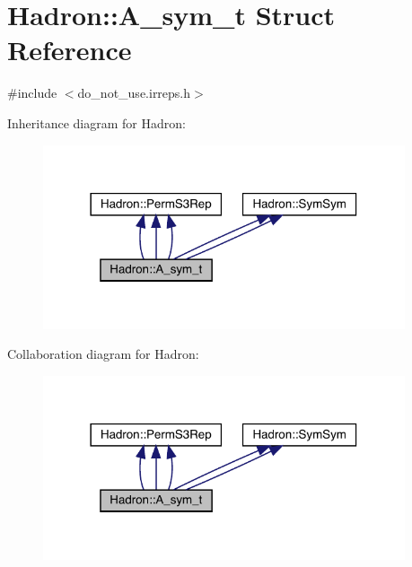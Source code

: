 \hypertarget{structHadron_1_1A__sym__t}{}\section{Hadron\+:\+:A\+\_\+sym\+\_\+t Struct Reference}
\label{structHadron_1_1A__sym__t}


{\ttfamily \#include $<$do\+\_\+not\+\_\+use.\+irreps.\+h$>$}



Inheritance diagram for Hadron\+:
\nopagebreak
\begin{figure}[H]
\begin{center}
\leavevmode
\includegraphics[width=302pt]{d3/d65/structHadron_1_1A__sym__t__inherit__graph}
\end{center}
\end{figure}


Collaboration diagram for Hadron\+:
\nopagebreak
\begin{figure}[H]
\begin{center}
\leavevmode
\includegraphics[width=302pt]{d3/dd8/structHadron_1_1A__sym__t__coll__graph}
\end{center}
\end{figure}
